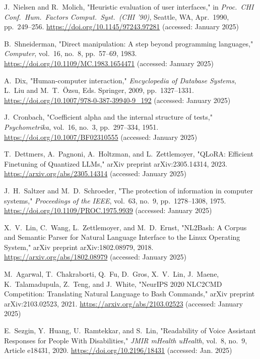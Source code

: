 \documentclass[a4paper,12pt]{article}
\begin{document}
\begin{thebibliography}{28}
 J.~Nielsen and R.~Molich, "Heuristic evaluation of user interfaces," in \textit{Proc.~CHI Conf.~Hum.~Factors Comput.~Syst.~(CHI '90)}, Seattle, WA, Apr.~1990, pp.~249--256. \url{https://doi.org/10.1145/97243.97281} (accessed: January 2025)

 B.~Shneiderman, "Direct manipulation: A step beyond programming languages," \textit{Computer}, vol.~16, no.~8, pp.~57--69, 1983. \url{https://doi.org/10.1109/MC.1983.1654471} (accessed: January 2025)

 A.~Dix, "Human-computer interaction," \textit{Encyclopedia of Database Systems}, L.~Liu and M.~T.~Özsu, Eds. Springer, 2009, pp.~1327--1331. \url{https://doi.org/10.1007/978-0-387-39940-9_192} (accessed: January 2025)

 J.~Cronbach, "Coefficient alpha and the internal structure of tests," \textit{Psychometrika}, vol.~16, no.~3, pp.~297--334, 1951. \url{https://doi.org/10.1007/BF02310555} (accessed: January 2025)

 T.~Dettmers, A.~Pagnoni, A.~Holtzman, and L.~Zettlemoyer, "QLoRA: Efficient Finetuning of Quantized LLMs," arXiv preprint arXiv:2305.14314, 2023. \url{https://arxiv.org/abs/2305.14314} (accessed: January 2025)

 J.~H.~Saltzer and M.~D.~Schroeder, "The protection of information in computer systems," \textit{Proceedings of the IEEE}, vol.~63, no.~9, pp.~1278--1308, 1975. \url{https://doi.org/10.1109/PROC.1975.9939} (accessed: January 2025)

 X.~V.~Lin, C.~Wang, L.~Zettlemoyer, and M.~D.~Ernst, "NL2Bash: A Corpus and Semantic Parser for Natural Language Interface to the Linux Operating System," arXiv preprint arXiv:1802.08979, 2018. \url{https://arxiv.org/abs/1802.08979} (accessed: January 2025)

 M.~Agarwal, T.~Chakraborti, Q.~Fu, D.~Gros, X.~V.~Lin, J.~Maene, K.~Talamadupula, Z.~Teng, and J.~White, "NeurIPS 2020 NLC2CMD Competition: Translating Natural Language to Bash Commands," arXiv preprint arXiv:2103.02523, 2021. \url{https://arxiv.org/abs/2103.02523} (accessed: January 2025)

 E.~Sezgin, Y.~Huang, U.~Ramtekkar, and S.~Lin, "Readability of Voice Assistant Responses for People With Disabilities," \textit{JMIR mHealth uHealth}, vol.~8, no.~9, Article e18431, 2020. \url{https://doi.org/10.2196/18431} (accessed: Jan. 2025)

\end{thebibliography}
\end{document}
